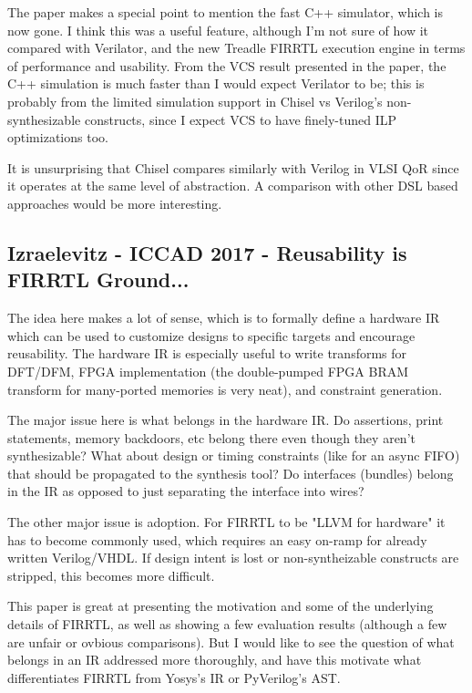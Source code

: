 The paper makes a special point to mention the fast C++ simulator, which is now gone. I think this was a useful feature, although I'm not sure of how it compared with Verilator, and the new Treadle FIRRTL execution engine in terms of performance and usability. From the VCS result presented in the paper, the C++ simulation is much faster than I would expect Verilator to be; this is probably from the limited simulation support in Chisel vs Verilog's non-synthesizable constructs, since I expect VCS to have finely-tuned ILP optimizations too.

It is unsurprising that Chisel compares similarly with Verilog in VLSI QoR since it operates at the same level of abstraction. A comparison with other DSL based approaches would be more interesting.

\subsection{Izraelevitz - ICCAD 2017 - Reusability is FIRRTL Ground...}
The idea here makes a lot of sense, which is to formally define a hardware IR which can be used to customize designs to specific targets and encourage reusability. The hardware IR is especially useful to write transforms for DFT/DFM, FPGA implementation (the double-pumped FPGA BRAM transform for many-ported memories is very neat), and constraint generation.

{\color{blue} The major issue here is what belongs in the hardware IR. Do assertions, print statements, memory backdoors, etc belong there even though they aren't synthesizable? What about design or timing constraints (like for an async FIFO) that should be propagated to the synthesis tool? Do interfaces (bundles) belong in the IR as opposed to just separating the interface into wires?}

{\color{blue} The other major issue is adoption. For FIRRTL to be "LLVM for hardware" it has to become commonly used, which requires an easy on-ramp for already written Verilog/VHDL. If design intent is lost or non-syntheizable constructs are stripped, this becomes more difficult.}

{\color{blue} This paper is great at presenting the motivation and some of the underlying details of FIRRTL, as well as showing a few evaluation results (although a few are unfair or ovbious comparisons). But I would like to see the question of what belongs in an IR addressed more thoroughly, and have this motivate what differentiates FIRRTL from Yosys's IR or PyVerilog's AST.}

\subsection{}

